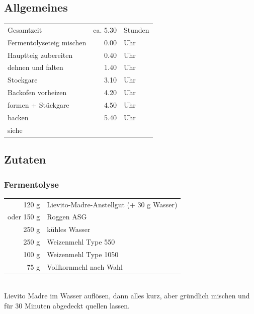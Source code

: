 \subsection*{Allgemeines}
\begin{tabular}{lrl}
    Gesamtzeit               &              ca. 5.30 & Stunden \\
    Fermentolyseteig mischen &                  0.00 & Uhr     \\
    Hauptteig zubereiten     &                  0.40 & Uhr     \\
    dehnen und falten        &                  1.40 & Uhr     \\
    Stockgare                &                  3.10 & Uhr     \\
    Backofen vorheizen       &                  4.20 & Uhr     \\
    formen + Stückgare       &                  4.50 & Uhr     \\
    backen                   &                  5.40 & Uhr     \\
    siehe                    & \cite[124]{SonjaBauer2021} &
\end{tabular}

\subsection*{Zutaten}

\subsubsection*{\Gls{Fermentolyse}}
\begin{tabular}{r l}
    120 g & Lievito-Madre-Anstellgut (+ 30 g Wasser)\\
    oder 150 g & Roggen ASG \\
    250 g & kühles Wasser\\
    250 g & Weizenmehl Type 550\\
    100 g & Weizenmehl Type 1050\\
    75  g & Vollkornmehl nach Wahl\\
\end{tabular}\\
Lievito Madre im Wasser auflösen, dann alles kurz, aber gründlich mischen und für 30 Minuten abgedeckt quellen lassen.


